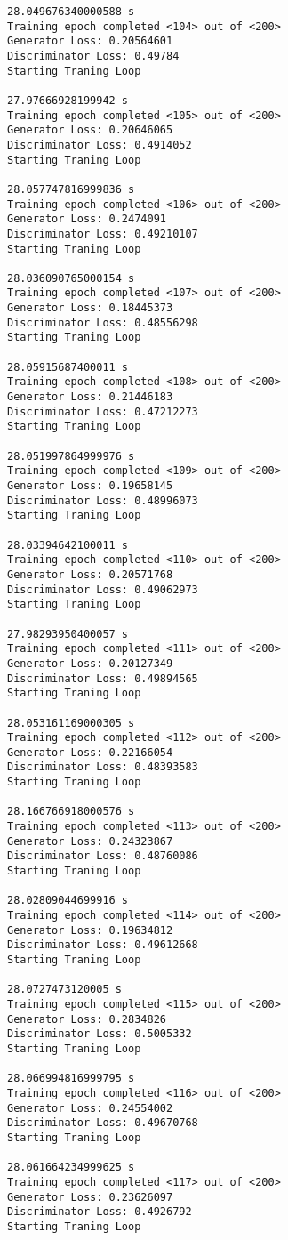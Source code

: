\documentclass[11pt]{article}
\begin{document}
\begin{Verbatim}[commandchars=\\\{\}]
28.049676340000588 s
Training epoch completed <104> out of <200>
Generator Loss: 0.20564601
Discriminator Loss: 0.49784
Starting Traning Loop 

27.97666928199942 s
Training epoch completed <105> out of <200>
Generator Loss: 0.20646065
Discriminator Loss: 0.4914052
Starting Traning Loop 

28.057747816999836 s
Training epoch completed <106> out of <200>
Generator Loss: 0.2474091
Discriminator Loss: 0.49210107
Starting Traning Loop 

28.036090765000154 s
Training epoch completed <107> out of <200>
Generator Loss: 0.18445373
Discriminator Loss: 0.48556298
Starting Traning Loop 

28.05915687400011 s
Training epoch completed <108> out of <200>
Generator Loss: 0.21446183
Discriminator Loss: 0.47212273
Starting Traning Loop 

28.051997864999976 s
Training epoch completed <109> out of <200>
Generator Loss: 0.19658145
Discriminator Loss: 0.48996073
Starting Traning Loop 

28.03394642100011 s
Training epoch completed <110> out of <200>
Generator Loss: 0.20571768
Discriminator Loss: 0.49062973
Starting Traning Loop 

27.98293950400057 s
Training epoch completed <111> out of <200>
Generator Loss: 0.20127349
Discriminator Loss: 0.49894565
Starting Traning Loop 

28.053161169000305 s
Training epoch completed <112> out of <200>
Generator Loss: 0.22166054
Discriminator Loss: 0.48393583
Starting Traning Loop 

28.166766918000576 s
Training epoch completed <113> out of <200>
Generator Loss: 0.24323867
Discriminator Loss: 0.48760086
Starting Traning Loop 

28.02809044699916 s
Training epoch completed <114> out of <200>
Generator Loss: 0.19634812
Discriminator Loss: 0.49612668
Starting Traning Loop 

28.0727473120005 s
Training epoch completed <115> out of <200>
Generator Loss: 0.2834826
Discriminator Loss: 0.5005332
Starting Traning Loop 

28.066994816999795 s
Training epoch completed <116> out of <200>
Generator Loss: 0.24554002
Discriminator Loss: 0.49670768
Starting Traning Loop 

28.061664234999625 s
Training epoch completed <117> out of <200>
Generator Loss: 0.23626097
Discriminator Loss: 0.4926792
Starting Traning Loop 


\end{Verbatim}
\end{document}
